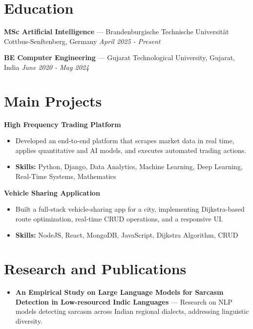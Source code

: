 \documentclass[a4paper,10pt]{article}
\begin{document}
\section*{Education}
\textbf{MSc Artificial Intelligence} — Brandenburgische Technische Universität Cottbus-Senftenberg, Germany \hfill \textit{April 2025 - Present}\par
\vspace{1.5pt}
\textbf{BE Computer Engineering} — Gujarat Technological University, Gujarat, India \hfill \textit{June 2020 - May 2024}\par

\section*{Main Projects}
\textbf{High Frequency Trading Platform}\par
\vspace{1pt}
\begin{itemize}
  \item Developed an end-to-end platform that scrapes market data in real time, applies quantitative and AI models, and executes automated trading actions.
  \item \textbf{Skills:} Python, Django, Data Analytics, Machine Learning, Deep Learning, Real-Time Systems, Mathematics
\end{itemize}
\vspace{3pt}
\textbf{Vehicle Sharing Application}\par
\vspace{1pt}
\begin{itemize}
  \item Built a full-stack vehicle-sharing app for a city, implementing Dijkstra-based route optimization, real-time CRUD operations, and a responsive UI.
  \item \textbf{Skills:} NodeJS, React, MongoDB, JavaScript, Dijkstra Algorithm, CRUD
\end{itemize}

\section*{Research and Publications}
\begin{itemize}
\item \textbf{An Empirical Study on Large Language Models for Sarcasm Detection in Low-resourced Indic Languages} — Research on NLP models detecting sarcasm across Indian regional dialects, addressing linguistic diversity.
\end{itemize}
\end{document}
